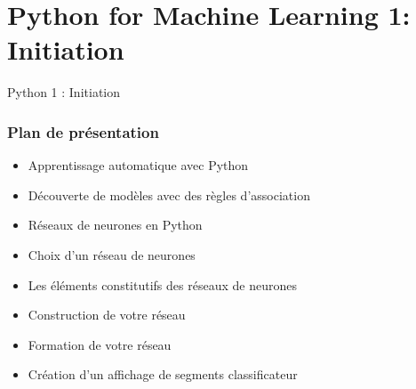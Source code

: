 \documentclass{beamer}
\begin{document}
\section{Python for Machine Learning 1: Initiation}
{
	\begin{frame}{Python 1 : Initiation}
	\end{frame}
}


\begin{frame}
	\frametitle{Plan de présentation}
	\begin{itemize}
		\item Apprentissage automatique avec Python
		\item Découverte de modèles avec des règles d'association
		\item Réseaux de neurones en Python
		\item Choix d'un réseau de neurones
		\item Les éléments constitutifs des réseaux de neurones
		\item Construction de votre réseau
		\item Formation de votre réseau
		\item Création d'un affichage de segments classificateur
	\end{itemize}
\end{frame}
\end{document}
